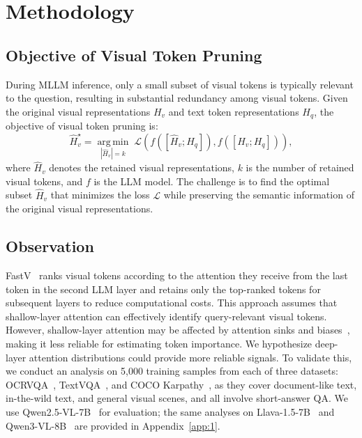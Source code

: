 \section{Methodology}\label{sec:method}
\subsection{Objective of Visual Token Pruning}
During MLLM inference, only a small subset of visual tokens is typically relevant to the question, resulting in substantial redundancy among visual tokens. Given the original visual representations $H_v$ and text token representations $H_q$, the objective of visual token pruning is:
\begin{equation}
    \hat{H}_v^{\star} = \operatorname*{arg\,min}_{|\hat{H}_v| = k}\; \mathcal{L}\left(f([\hat{H}_v; H_q]), f([H_v; H_q])\right),
\label{eq:obj}
\end{equation}
where $\hat{H}_v$ denotes the retained visual representations, $k$ is the number of retained visual tokens, and $f$ is the LLM model. The challenge is to find the optimal subset $\hat{H}_v$ that minimizes the loss $\mathcal{L}$ while preserving the semantic information of the original visual representations.

\subsection{Observation} \label{sec:obs}
FastV~\cite{fastv} ranks visual tokens according to the attention they receive from the last token in the second LLM layer and retains only the top-ranked tokens for subsequent layers to reduce computational costs. This approach assumes that shallow-layer attention can effectively identify query-relevant visual tokens. However, shallow-layer attention may be affected by attention sinks and biases~\cite{sink,dsas}, making it less reliable for estimating token importance. We hypothesize deep-layer attention distributions could provide more reliable signals. To validate this, we conduct an analysis on 5,000 training samples from each of three datasets: OCRVQA~\cite{ocrvqa}, TextVQA~\cite{textvqa}, and COCO Karpathy~\cite{karpathy2015deep}, as they cover document-like text, in-the-wild text, and general visual scenes, and all involve short-answer QA. We use Qwen2.5-VL-7B~\cite{qwen2.5} for evaluation; the same analyses on Llava-1.5-7B~\cite{llava1.5} and Qwen3-VL-8B~\cite{qwen3vl} are provided in Appendix~\ref{app:1}.

